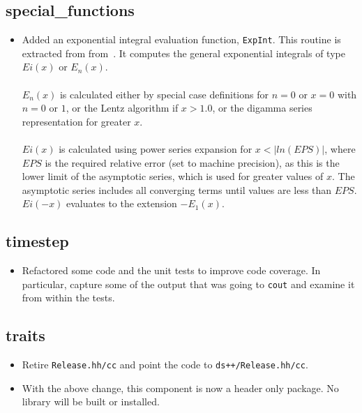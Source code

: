 \documentclass[note]{ResearchNote_pdf}
\begin{document}

\subsection{special\_functions}
\label{changes:special-functions}
\begin{itemize}

\item Added an exponential integral evaluation function,
  \texttt{ExpInt}. This routine is extracted from
  from~\cite{numericalrecipesforcpp}.  It computes the general
  exponential integrals of type $Ei(x)$ or $E_n(x)$. \\
  \\
  $E_n(x)$ is calculated either by special case definitions for $n=0$
  or $x=0$ with $n=0$ or $1$, or the Lentz algorithm if $x>1.0$, or
  the digamma series representation for greater $x$. \\
  \\
  $Ei(x)$ is calculated using power series expansion for
  $x<|ln(EPS)|$, where $EPS$ is the required relative error (set to
  machine precision), as this is the lower limit of the asymptotic
  series, which is used for greater values of $x$. The asymptotic
  series includes all converging terms until values are less than
  $EPS$. $Ei(-x)$ evaluates to the extension $-E_1(x)$.
\end{itemize}

\subsection{timestep}
\label{changes:timestep}
\begin{itemize}
\item Refactored some code and the unit tests to improve code
  coverage.  In particular, capture some of the output that was going
  to \texttt{cout} and examine it from within the tests.
\end{itemize}

\subsection{traits}
\label{changes:traits}
\begin{itemize}
\item Retire \texttt{Release.hh/cc} and point the code to
  \texttt{ds++/Release.hh/cc}.  
\item With the above change, this component is now a header only
  package.  No library will be built or installed.
\end{itemize}
\end{document}
